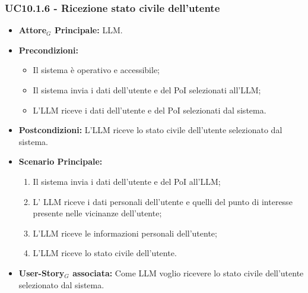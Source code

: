 \documentclass[11pt]{article}
\begin{document}
\begin{justify}
\subsubsection{\textbf{UC10.1.6 - Ricezione stato civile dell'utente}}
\begin{itemize}
    \item \textbf{Attore$_G$ Principale:} LLM.
    \item \textbf{Precondizioni:} 
        \begin{itemize}
          \item Il sistema è operativo e accessibile;
          \item Il sistema invia i dati dell'utente e del PoI selezionati all'LLM;
            \item L'LLM riceve i dati dell'utente e del PoI selezionati dal sistema.
        \end{itemize}
      \item \textbf{Postcondizioni:} L'LLM riceve lo stato civile dell'utente selezionato dal sistema.
    \item \textbf{Scenario Principale:} 
        \begin{enumerate}
          \item Il sistema invia i dati dell'utente e del PoI all'LLM;
        \item L' LLM riceve i dati personali dell'utente e quelli del punto di interesse presente nelle vicinanze dell'utente;
          \item L'LLM riceve le informazioni personali dell'utente;
          \item L'LLM riceve lo stato civile dell'utente.
        \end{enumerate}
      \item \textbf{User-Story$_G$ associata:} Come LLM voglio ricevere lo stato civile dell'utente selezionato dal sistema.
\end{itemize}

\end{justify}
\end{document}
